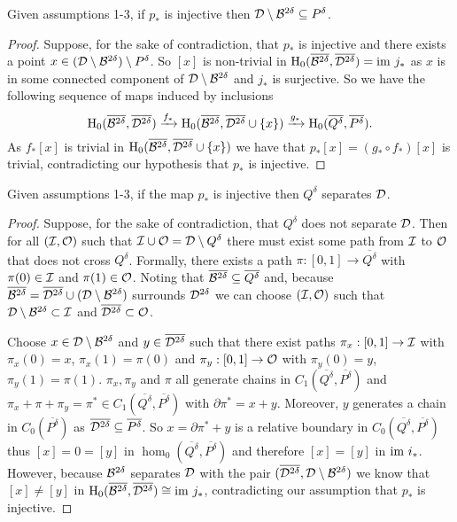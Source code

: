 \begin{lemma}\label{lem:coverage}
    Given assumptions 1-3, if $p_*$ is injective then ${\mathcal{D}}\setminus{\mathcal{B}}^{2\delta}\subseteq P^\delta$.
\end{lemma}
\begin{proof}
    Suppose, for the sake of contradiction, that $p_*$ is injective and there exists a point $x\in ({\mathcal{D}}\setminus{\mathcal{B}}^{2\delta})\setminus P^\delta$.
    So $[x]$ is non-trivial in $\mathrm{H}_0(\overline{{\mathcal{B}}^{2\delta}},\overline{{\mathcal{D}}^{2\delta}}) = \mathrm{im}~j_*$ as $x$ is in some connected component of ${\mathcal{D}}\setminus{\mathcal{B}}^{2\delta}$ and $j_*$ is surjective.
    So we have the following sequence of maps induced by inclusions
    \[ \mathrm{H}_0(\overline{{\mathcal{B}}^{2\delta}},\overline{{\mathcal{D}}^{2\delta}})\xrightarrow{f_*} \mathrm{H}_0(\overline{{\mathcal{B}}^{2\delta}},\overline{{\mathcal{D}}^{2\delta}}\cup\{x\})\xrightarrow{g_*} \mathrm{H}_0(\overline{Q^\delta},\overline{P^\delta}).\]
    As $f_*[x]$ is trivial in $\mathrm{H}_0(\overline{{\mathcal{B}}^{2\delta}},\overline{{\mathcal{D}}^{2\delta}}\cup\{x\})$ we have that $p_*[x] = (g_*\circ f_*)[x]$ is trivial, contradicting our hypothesis that $p_*$ is injective.
\end{proof}

\begin{lemma}\label{lem:separate}
    Given assumptions 1-3, if the map $p_*$ is injective then $Q^\delta$ separates ${\mathcal{D}}$.
\end{lemma}
\begin{proof}
    Suppose, for the sake of contradiction, that $Q^\delta$ does not separate ${\mathcal{D}}$.
    Then for all $({\mathcal{I}}, \mathcal{O})$ such that ${\mathcal{I}} \cup \mathcal{O} = {\mathcal{D}}\setminus Q^\delta$ there must exist some path from ${\mathcal{I}}$ to $\mathcal{O}$ that does not cross $Q^\delta$.
    Formally, there exists a path $\pi : [0,1]\to\overline{Q^\delta}$ with $\pi(0)\in {\mathcal{I}}$ and $\pi(1)\in\mathcal{O}$.
    Noting that $\overline{{\mathcal{B}}^{2\delta}}\subseteq \overline{Q^\delta}$ and, because $\overline{{\mathcal{B}}^{2\delta}} = \overline{{\mathcal{D}}^{2\delta}}\cup ({\mathcal{D}}\setminus{\mathcal{B}}^{2\delta})$ surrounds ${\mathcal{D}}^{2\delta}$ we can choose $({\mathcal{I}}, \mathcal{O})$ such that ${\mathcal{D}}\setminus {\mathcal{B}}^{2\delta}\subset {\mathcal{I}}$ and $\overline{{\mathcal{D}}^{2\delta}}\subset \mathcal{O}$.

    Choose $x\in{\mathcal{D}}\setminus {\mathcal{B}}^{2\delta}$ and $y\in \overline{{\mathcal{D}}^{2\delta}}$ such that there exist paths $\pi_x : [0,1]\to {\mathcal{I}}$ with $\pi_x(0) = x$, $\pi_x(1) = \pi(0)$ and $\pi_y : [0,1]\to \mathcal{O}$ with $\pi_y(0) = y$, $\pi_y(1) = \pi(1)$.
    $\pi_x, \pi_y$ and $\pi$ all generate chains in $C_1(\overline{Q^\delta}, \overline{P^\delta})$ and $\pi_x + \pi + \pi_y = \pi^*\in C_1(\overline{Q^\delta}, \overline{P^\delta})$ with $\partial\pi^* = x + y$.
    Moreover, $y$ generates a chain in $C_0(\overline{P^\delta})$ as $\overline{{\mathcal{D}}^{2\delta}}\subseteq\overline{P^\delta}$.
    So $x = \partial\pi^* + y$ is a relative boundary in $C_0(\overline{Q^\delta}, \overline{P^\delta})$ thus $[x] = 0 = [y]$ in $\hom_0(\overline{Q^\delta}, \overline{P^\delta})$ and therefore $[x] = [y]$ in $\mathrm{im}~i_*$.
    However, because ${\mathcal{B}}^{2\delta}$ separates ${\mathcal{D}}$ with the pair $(\overline{{\mathcal{D}}^{2\delta}}, {\mathcal{D}}\setminus{\mathcal{B}}^{2\delta})$ we know that $[x]\neq [y]$ in $\mathrm{H}_0(\overline{{\mathcal{B}}^{2\delta}}, \overline{{\mathcal{D}}^{2\delta}})\cong \mathrm{im}~j_*$, contradicting our assumption that $p_*$ is injective.
\end{proof}

